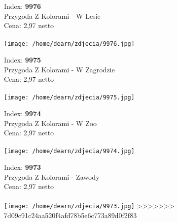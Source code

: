 {Index: \textbf{9976}\\
Przygoda Z Kolorami - W Lesie\\
Cena: 2,97 netto   \\\\  \texttt{[image: /home/dearn/zdjecia/9976.jpg]}}\newline\newline

{Index: \textbf{9975}\\
Przygoda Z Kolorami - W Zagrodzie \\
Cena: 2,97 netto   \\\\  \texttt{[image: /home/dearn/zdjecia/9975.jpg]}}\newline\newline

{Index: \textbf{9974}\\
Przygoda Z Kolorami - W Zoo \\
Cena: 2,97 netto   \\\\  \texttt{[image: /home/dearn/zdjecia/9974.jpg]}}\newline\newline

{Index: \textbf{9973}\\
Przygoda Z Kolorami - Zawody \\
Cena: 2,97 netto   \\\\  \texttt{[image: /home/dearn/zdjecia/9973.jpg]}}\newline\newline
>>>>>>> 7d09c91c24aa520f4afd78b5e6c773a89d0f2f83
